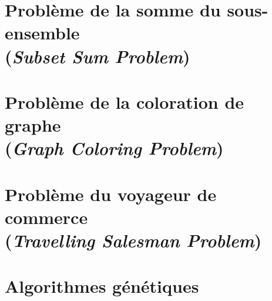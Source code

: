 \documentclass[11pt]{article} %
\begin{document}
\newpage
\section{Problème de la somme du sous-ensemble 
\\ (\textit{Subset Sum Problem})}


\newpage
\section{Problème de la coloration de graphe 
\\ (\textit{Graph Coloring Problem})}


\newpage
\section{Problème du voyageur de commerce 
\\(\textit{Travelling Salesman Problem})}


\newpage
\section{Algorithmes génétiques}

\end{document}

